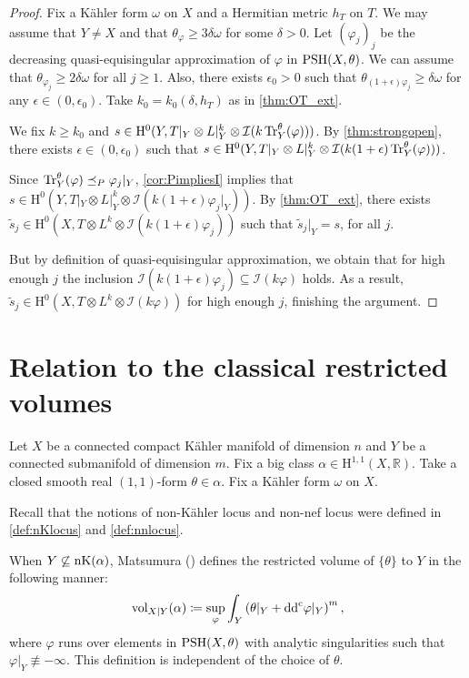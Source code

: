 \begin{proof}
Fix a Kähler form $\omega$ on $X$ and a Hermitian metric $h_T$ on $T$.
We may assume that $Y\neq X$ and that $\theta_{\varphi} \geq 3\delta \omega$ for some $\delta>0$. Let $(\varphi_j)_j$ be the decreasing quasi-equisingular approximation of $\varphi$ in $\mathrm{PSH}(X,\theta)$. We can assume that $\theta_{\varphi_j} \geq 2\delta \omega$ for all $j\geq 1$. Also, there exists $\epsilon_0 >0$ such that $\theta_{(1+\epsilon)\varphi_j} \geq \delta \omega$ for any $\epsilon \in (0,\epsilon_0)$. Take $k_0=k_0(\delta,h_T)$ as in \cref{thm:OT_ext}.


We fix $k \geq k_0$ and $s \in \mathrm{H}^0(Y, T|_Y\otimes L|_Y^k\otimes \mathcal{I}(k\operatorname{Tr}_Y^{\theta}(\varphi)))$. By \cref{thm:strongopen}, there exists $\epsilon \in (0,\epsilon_0)$ such that $s \in \mathrm{H}^0(Y, T|_Y\otimes L|_Y^k\otimes \mathcal{I}(k(1+\epsilon)\operatorname{Tr}_Y^{\theta}(\varphi)))$.

Since $\operatorname{Tr}_Y^{\theta}(\varphi) \preceq_P \varphi_j|_Y$, \cref{cor:PimpliesI} implies that $s \in \mathrm{H}^0(Y, T|_Y\otimes L|_Y^k\otimes \mathcal{I}(k(1+\epsilon)\varphi_j|_Y))$. By \cref{thm:OT_ext}, there exists $\tilde s_j \in \mathrm{H}^0(X, T\otimes L^k \otimes \mathcal{I}(k(1+\epsilon)\varphi_j))$ such that $\tilde s_j|_Y =s$, for all $j$.

But by definition of quasi-equisingular approximation, we obtain that for high enough $j$ the inclusion $\mathcal{I}(k(1+\epsilon)\varphi_j) \subseteq \mathcal{I}(k\varphi)$ holds. As a result, $\tilde s_j \in \mathrm{H}^0(X, T\otimes L^k \otimes \mathcal{I}(k\varphi))$ for high enough $j$, finishing the argument.
\end{proof}


\section{Relation to the classical restricted volumes}\label{sec:rv}
Let $X$ be a connected compact Kähler manifold of dimension $n$ and $Y$ be a connected submanifold of dimension $m$. Fix a big class $\alpha\in \mathrm{H}^{1,1}(X,\mathbb{R})$. Take a closed smooth real $(1,1)$-form $\theta\in \alpha$. Fix a Kähler form $\omega$ on $X$.

Recall that the notions of non-Kähler locus and non-nef locus were defined in \cref{def:nKlocus} and \cref{def:nnlocus}.

When $Y\not\subseteq \operatorname{nK}(\alpha)$, Matsumura (\cite[Definition~1.4]{Mat13}) defines the restricted volume of $\{\theta\}$ to $Y$ in the following manner:
\begin{equation}\label{eq:rest_vol_Mat_def}
        \operatorname{vol}_{X|Y}(\alpha)\coloneqq \sup_{\varphi} \int_Y \left(\theta|_Y+\mathrm{dd}^{\mathrm{c}} \varphi|_Y\right)^{m},
\end{equation}
where $\varphi$ runs over elements in $\mathrm{PSH}(X,\theta)$ with analytic singularities such that $\varphi|_Y\not\equiv -\infty$. This definition is independent of the choice of $\theta$.

